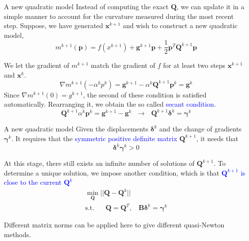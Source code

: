 \documentclass{beamer}
\begin{document}
\begin{frame}{A new quadratic model}
Instead of computing the exact $\boldsymbol{Q}$, we can update it in a simple manner to account for the curvature measured during the most recent step. Suppose, we have generated $\boldsymbol{x}^{k+1}$ and wish to construct a new quadratic model,
\begin{equation*}
    m^{k+1} (\boldsymbol{p}) = f(x^{k+1}) + \boldsymbol{g}^{k+1} \boldsymbol{p} + \frac{1}{2} \boldsymbol{p}^T \boldsymbol{Q}^{k+1} \boldsymbol{p}
\end{equation*}

We let the gradient of $m^{k+1}$ match the gradient of $f$ for at least two steps $\boldsymbol{x}^{k+1}$ and $\boldsymbol{x}^{k}$. 
\begin{equation*}
    \nabla m^{k+1} (-\alpha^k p^k) = \boldsymbol{g}^{k+1} - \alpha^k \boldsymbol{Q}^{k+1} \boldsymbol{p}^k = \boldsymbol{g}^k
\end{equation*}
Since $\nabla m^{k+1}(0)= g^{k+1}$, the second of these condition is satisfied automatically.  
Rearranging it, we obtain the so called \textcolor{blue}{secant condition}.
\begin{equation}
    \boldsymbol{Q}^{k+1} \alpha^k \boldsymbol{p}^k = \boldsymbol{g}^{k+1} - \boldsymbol{g}^k ~~~\rightarrow~~~
    \boldsymbol{Q}^{k+1} \boldsymbol{\delta}^k = \boldsymbol{\gamma}^{k} 
\end{equation}

\end{frame}

\begin{frame}{A new quadratic model}
Given the displacements $\boldsymbol{\delta}^k$ and the change of gradients $\boldsymbol{\gamma}^k$. It requires that the \textcolor{blue}{symmetric
positive definite matrix} $\boldsymbol{Q}^{k+1}$, it needs that
\begin{equation*}
    \boldsymbol{\delta}^{k}\boldsymbol{\gamma}^{k} > 0    
\end{equation*}

At this stage, there still exists an infinite number of solutions of $\boldsymbol{Q}^{k+1}$. To determine a unique solution, we impose another condition, which is that \textcolor{blue}{$\boldsymbol{Q}^{k+1}$ is close to the current $\boldsymbol{Q}^{k}$}
\begin{gather*}
    \underset{\boldsymbol{Q}}{\min} ||\boldsymbol{Q} - \boldsymbol{Q}^{k}|| \\
    \textrm{s.t.~~~~~} \boldsymbol{Q} = \boldsymbol{Q}^T,~~~~    \boldsymbol{B \delta}^k = \boldsymbol{\gamma}^k
\end{gather*}

Different matrix norms can be applied here to give different quasi-Newton methods.

\end{frame}
\end{document}
